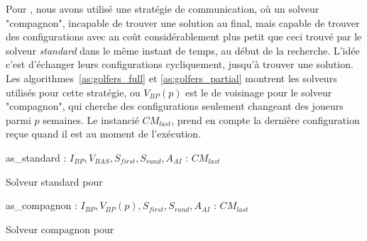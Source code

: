 \documentclass{jfpc-preprint}
\begin{document}
Pour \SGP{}, nous avons utilisé une stratégie de communication, où un solveur "compagnon", incapable de trouver une solution au final, mais capable de trouver des configurations avec an coût considérablement plus petit que ceci trouvé par le solveur \textit{standard} dans le même instant de temps, au début de la recherche. L'idée c'est d'échanger leurs configurations cycliquement, jusqu'à trouver une solution. Les algorithmes~\ref{as:golfers_full} et \ref{as:golfers_partial} montrent les solveurs utilisés pour cette stratégie, ou $V_{BP}(p)$ est le \om{} de voisinage pour le solveur "compagnon", qui cherche des configurations seulement changeant des joueurs parmi $p$ semaines. Le \opch{} instancié $CM_{last}$, prend en compte la dernière configuration reçue quand il est au moment de l'exécution.

\begin{algorithm}
\dontprintsemicolon
\scriptsize
\SetNoline
{}
   as\_standard\;
\algoindent {} : $I_{BP}, V_{BAS}, S_{first}, S_{rand}, A_{AI}$ \;
\algoindent {} : $CM_{last}$ \;
\caption{Solveur standard pour \SGP}\label{as:golfers_full}
\end{algorithm}

\begin{algorithm}
\dontprintsemicolon
\scriptsize
\SetNoline
{}
   as\_compagnon\;
\algoindent {} : $I_{BP}, V_{BP}(p), S_{first}, S_{rand}, A_{AI}$ \;
\algoindent {} : $CM_{last}$ \;
\caption{Solveur compagnon pour \SGP}\label{as:golfers_partial}
\end{algorithm}
\end{document}

